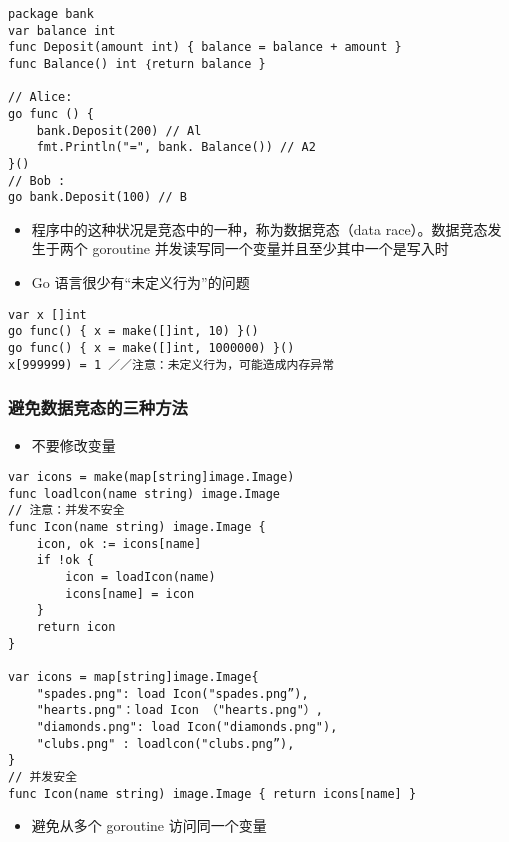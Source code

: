 \begin{verbatim}
package bank
var balance int
func Deposit(amount int) { balance = balance + amount }
func Balance() int ｛return balance }

// Alice:
go func () {
    bank.Deposit(200) // Al
    fmt.Println("=", bank. Balance()) // A2
}()
// Bob :
go bank.Deposit(100) // B
\end{verbatim}

\begin{itemize}
\tightlist
\item
  程序中的这种状况是竞态中的一种，称为数据竞态（data
  race）。数据竞态发生于两个 goroutine
  并发读写同一个变量并且至少其中一个是写入时
\item
  Go 语言很少有``未定义行为''的问题
\end{itemize}

\begin{verbatim}
var x []int
go func() { x = make([]int, 10) }()
go func() { x = make([]int, 1000000) }()
x[999999) = 1 ／／注意：未定义行为，可能造成内存异常
\end{verbatim}

\hypertarget{ux907fux514dux6570ux636eux7adeux6001ux7684ux4e09ux79cdux65b9ux6cd5}{%
\subsubsection{避免数据竞态的三种方法}\label{ux907fux514dux6570ux636eux7adeux6001ux7684ux4e09ux79cdux65b9ux6cd5}}

\begin{itemize}
\tightlist
\item
  不要修改变量
\end{itemize}

\begin{verbatim}
var icons = make(map[string]image.Image)
func loadlcon(name string) image.Image
// 注意：并发不安全
func Icon(name string) image.Image {
    icon, ok := icons[name]
    if !ok {
        icon = loadIcon(name)
        icons[name] = icon
    }
    return icon
}

var icons = map[string]image.Image{
    "spades.png": load Icon("spades.png”),
    "hearts.png"：load Icon （"hearts.png"）,
    "diamonds.png": load Icon("diamonds.png"),
    "clubs.png" : loadlcon("clubs.png”),
}
// 并发安全
func Icon(name string) image.Image { return icons[name] }
\end{verbatim}

\begin{itemize}
\tightlist
\item
  避免从多个 goroutine 访问同一个变量
\end{itemize}

